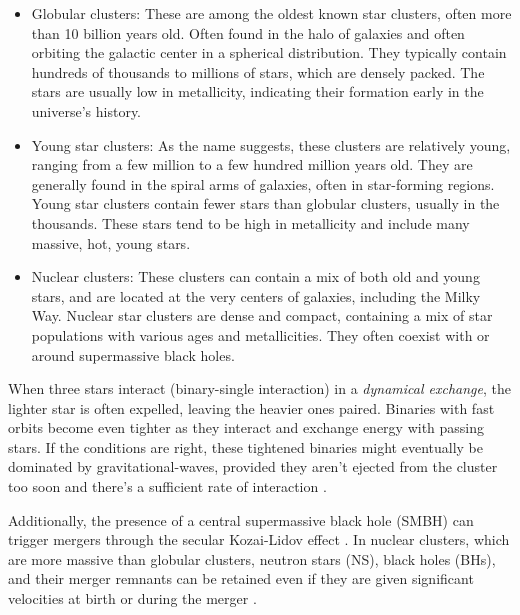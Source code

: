 \begin{itemize}
    \item Globular clusters: These are among the oldest known star clusters, often more than 10 billion years old. Often found in the halo of galaxies and often orbiting the galactic center in a spherical distribution. They typically contain hundreds of thousands to millions of stars, which are densely packed. The stars are usually low in metallicity, indicating their formation early in the universe's history.
    \item Young star clusters: As the name suggests, these clusters are relatively young, ranging from a few million to a few hundred million years old. They are generally found in the spiral arms of galaxies, often in star-forming regions. Young star clusters contain fewer stars than globular clusters, usually in the thousands. These stars tend to be high in metallicity and include many massive, hot, young stars.
    \item Nuclear clusters: These clusters can contain a mix of both old and young stars, and are located at the very centers of galaxies, including the Milky Way. Nuclear star clusters are dense and compact, containing a mix of star populations with various ages and metallicities. They often coexist with or around supermassive black holes.
\end{itemize}

When three stars interact (binary-single interaction) in a \textit{dynamical exchange}, the lighter star is often expelled, leaving the heavier ones paired. Binaries with fast orbits become even tighter as they interact and exchange energy with passing stars. If the conditions are right, these tightened binaries might eventually be dominated by gravitational-waves, provided they aren't ejected from the cluster too soon and there's a sufficient rate of interaction \cite{Ziosi:2014sra, Quinlan:1996vp}.

Additionally, the presence of a central supermassive black hole (SMBH) can trigger mergers through the secular Kozai-Lidov effect \cite{Antonini:2016gqe}. In nuclear clusters, which are more massive than globular clusters, neutron stars (NS), black holes (BHs), and their merger remnants can be retained even if they are given significant velocities at birth or during the merger \cite{Antonini:2018auk}.\\


